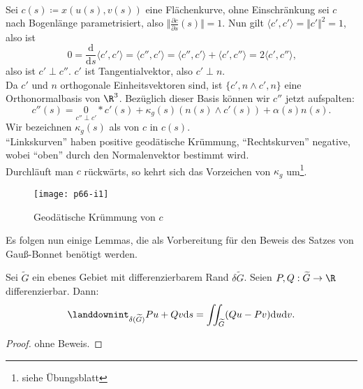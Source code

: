 \begin{definition}
  \ \\
  Sei $ c(s) \coloneqq x(u(s), v(s)) $ eine Flächenkurve, ohne Einschränkung sei $ c $ nach Bogenlänge parametrisiert, also $ \Vert \frac{\partial c}{\partial s} (s) \Vert = 1 $. Nun gilt $ \langle c', c' \rangle = \Vert c' \Vert^2 = 1 $, also ist
  \begin{equation*}
    0 = \frac{\text{d}}{\text{d}s}\langle c', c' \rangle = \langle c'', c' \rangle = \langle c'', c' \rangle + \langle c', c'' \rangle = 2\langle c', c'' \rangle\text{,}
  \end{equation*}
  also ist $ c' \perp c'' $. $ c' $ ist Tangentialvektor, also $ c' \perp n $. \\
  Da $ c' $ und $ n $ orthogonale Einheitsvektoren sind, ist $ \{ c', n \wedge c', n \} $ eine Orthonormalbasis von $ \R^3 $. Bezüglich dieser Basis können wir $ c'' $ jetzt aufspalten:
  \begin{equation*}
    c''(s) = \underset{c'' \perp c'}{0}*c'(s) + \kappa_g(s)(n(s) \wedge c'(s)) + \alpha(s)n(s)\text{.}
  \end{equation*}
  Wir bezeichnen $ \kappa_g(s) $ als \label{def:geodaetischeKruemmung} von $ c $ in $ c(s) $. \\
  ``Linkskurven'' haben positive geodätische Krümmung, ``Rechtskurven'' negative, wobei ``oben'' durch den Normalenvektor bestimmt wird. \\
  Durchläuft man $ c $ rückwärts, so kehrt sich das Vorzeichen von $ \kappa_g $ um\footnote{siehe Übungsblatt}.
  \begin{figure}[H]
    \texttt{[image: p66-i1]}
    \caption{Geodätische Krümmung von \( c \)}
  \end{figure}
\end{definition}


Es folgen nun einige Lemmas, die als Vorbereitung für den Beweis des Satzes von Gauß-Bonnet benötigt werden.

\begin{lemma}
  Sei $ \widetilde{G} $ ein ebenes Gebiet mit differenzierbarem Rand $ \delta\widetilde{G} $. Seien $ P,Q : \widetilde{G} \to \R $ differenzierbar. Dann:
  \begin{equation*}
     \landdownint_{\delta(\widetilde{G})}Pu+Qv \text{d}s = \iint_{\widetilde{G}}(Qu-Pv)\text{d}u\text{d}v\text{.}
  \end{equation*} 
  \begin{proof}
    ohne Beweis.
  \end{proof}
\end{lemma}

